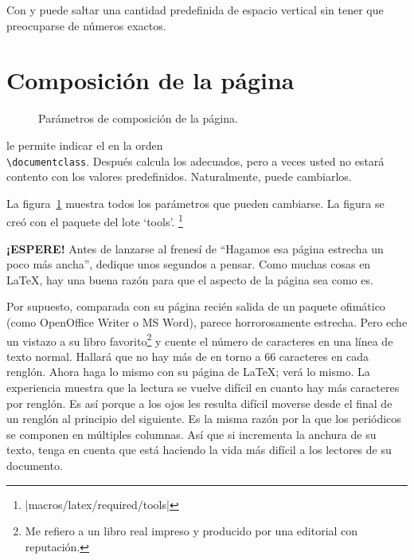 Con   y  puede saltar una cantidad predefinida de espacio vertical sin tener que preocuparse de números exactos.

\section{Composición de la página}

\begin{figure}[!hp]
\begin{center}
\makeatletter\@mylayout\makeatother
\end{center}
\vspace*{3ex}
\caption{Parámetros de composición de la página.}
\label{fig:layout}
\end{figure}
\LaTeXe{} le permite indicar el  en la orden \\ \verb|\documentclass|.  Después calcula los  adecuados, pero a veces usted no estará contento con los valores predefinidos. Naturalmente, puede cambiarlos. %

\thispagestyle{fancyplain}
La figura~\ref{fig:layout} muestra todos los parámetros que pueden cambiarse.  La figura se creó con el paquete  del lote `tools'. \footnote{\CTANref|macros/latex/required/tools|}

\textbf{¡ESPERE!} Antes de lanzarse al frenesí de  ``Hagamos esa página estrecha un poco más ancha'', dedique unos segundos a pensar. Como muchas cosas en \LaTeX, hay una buena razón para que el aspecto de la página sea como es.

Por supuesto, comparada con su página recién salida de un paquete ofimático (como OpenOffice Writer o  MS Word), parece horrorosamente estrecha.  Pero eche un vistazo a su libro favorito\footnote{Me refiero a un libro real impreso y producido por una editorial con reputación.} y cuente el número de caracteres en una línea de texto normal.  Hallará que no hay más de en torno a 66 caracteres en cada renglón.  Ahora haga lo mismo con su página de \LaTeX{}; verá lo mismo.  La experiencia muestra que la lectura se vuelve difícil en cuanto hay más caracteres por renglón.  Es así porque a los ojos les resulta difícil moverse desde el final de un renglón al principio del siguiente.  Es la misma razón por la que los periódicos se componen en múltiples columnas. Así que si incrementa la anchura de su texto, tenga en cuenta que está haciendo la vida más difícil a los lectores de su documento.
 
